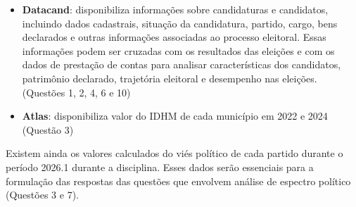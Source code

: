 \begin{itemize}
    \item \textbf{Datacand}: disponibiliza informações sobre candidaturas e candidatos, incluindo dados cadastrais, situação da candidatura, partido, cargo, bens declarados e outras informações associadas ao processo eleitoral. Essas informações podem ser cruzadas com os resultados das eleições e com os dados de prestação de contas para analisar características dos candidatos, patrimônio declarado, trajetória eleitoral e desempenho nas eleições. (Questões 1, 2, 4, 6 e 10)

    \item \textbf{Atlas}: disponibiliza valor do IDHM de cada município em 2022 e 2024 (Questão 3)
\end{itemize}

Existem ainda os valores calculados do viés político de cada partido durante o período 2026.1 durante a disciplina.
Esses dados serão essenciais para a formulação das respostas das questões que envolvem análise de espectro político 
(Questões 3 e 7).

